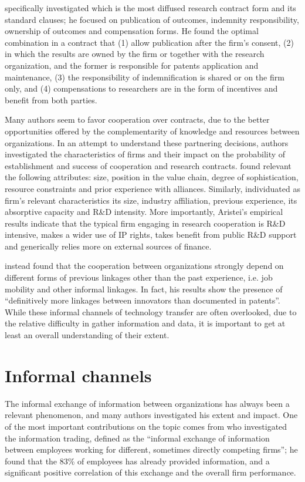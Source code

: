 \citet{Sohn2012} specifically investigated which is the most diffused research contract form and its standard clauses; he focused on publication of outcomes, indemnity responsibility, ownership of outcomes and compensation forms. He found the optimal combination in a contract that (1) allow publication after the firm's consent, (2) in which the results are owned by the firm or together with the research organization, and the former is responsible for patents application and maintenance, (3) the responsibility of indemnification is shared or on the firm only, and (4) compensations to researchers are in the form of incentives and benefit from both parties. 

Many authors seem to favor cooperation over contracts, due to the better opportunities offered by the complementarity of knowledge and resources between organizations. In an attempt to understand these partnering decisions, authors investigated the characteristics of firms and their impact on the probability of establishment and success of cooperation and research contracts. \citet{Powell1996} found relevant the following attributes: size, position in the value chain, degree of sophistication, resource constraints and prior experience with alliances. Similarly, \citet{Aristei2016} individuated as firm's relevant characteristics its size, industry affiliation, previous experience, its absorptive capacity and R\&D intensity. More importantly, Aristei's empirical results indicate that the typical firm engaging in research cooperation is R\&D intensive, makes a wider use of IP rights, takes benefit from public R\&D support and generically relies more on external sources of finance.

\citet{Cantner2006} instead found that the cooperation between organizations strongly depend on different forms of previous linkages other than the past experience, i.e. job mobility and other informal linkages. In fact, his results show the presence of \enquote{definitively more linkages between innovators than documented in patents}. While these informal channels of technology transfer are often overlooked, due to the relative difficulty in gather information and data, it is important to get at least an overall understanding of their extent. 

\section{Informal channels}

The informal exchange of information between organizations has always been a relevant phenomenon, and many authors investigated his extent and impact. One of the most important contributions on the topic comes from \citet{Schrader1991} who investigated the information trading, defined as the \enquote{informal exchange of information between employees working for different, sometimes directly competing firms}; he found that the 83\% of employees has already provided information, and a significant positive correlation of this exchange and the overall firm performance.

